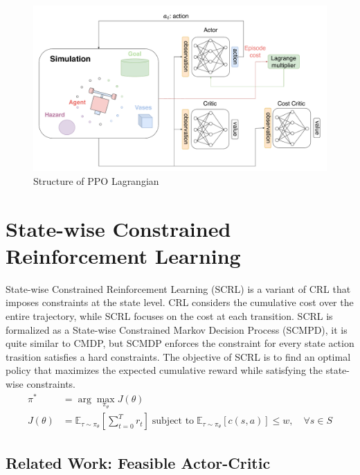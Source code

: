 \begin{figure}[t]
  \centering
  \includegraphics[width=1.0\textwidth]{imgs/chap2/ppo_lag.pdf}
  \caption{Structure of PPO Lagrangian}
  \label{chap2:fig:ppo_lag}
\end{figure}

\section{State-wise Constrained Reinforcement Learning} \label{chap2:sec5}

State-wise Constrained Reinforcement Learning (SCRL) is a variant of CRL that imposes constraints at the state level.
CRL considers the cumulative cost over the entire trajectory, while SCRL focuses on the cost at each transition.
SCRL is formalized as a State-wise Constrained Markov Decision Process (SCMPD), it is quite similar to CMDP, but SCMDP enforces the constraint for every state action trasition satisfies a hard constraints.
The objective of SCRL is to find an optimal policy that maximizes the expected cumulative reward while satisfying the state-wise constraints.
\begin{equation}
  \begin{aligned}
    \pi^* &= \arg\max_{\pi_\theta} J(\theta) \\
    J(\theta) &= \mathbb{E}_{\tau \sim \pi_\theta} \left[ \sum^T_{t = 0} r_t \right] \; \text{subject to} \; \mathbb{E}_{\tau \sim \pi_\theta}  [c(s, a)] \leq w, \quad \forall s \in S
  \end{aligned}
\end{equation}

\subsection{Related Work: Feasible Actor-Critic} \label{chap2:sec5:fac}

